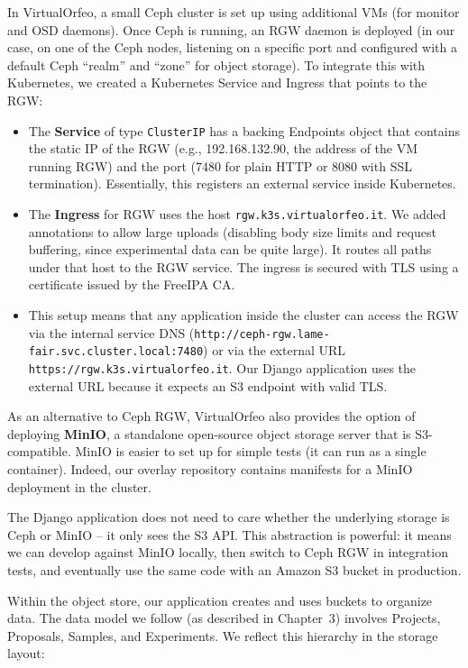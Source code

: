 In VirtualOrfeo, a small Ceph cluster is set up using additional VMs (for monitor 
and OSD daemons). Once Ceph is running, an RGW daemon is deployed (in our case, 
on one of the Ceph nodes, listening on a specific port and configured with a 
default Ceph ``realm'' and ``zone'' for object storage). To integrate this with 
Kubernetes, we created a Kubernetes Service and Ingress that points to the RGW:  

\begin{itemize}
	\item The \textbf{Service} of type \texttt{ClusterIP} has a backing Endpoints 
	object that contains the static IP of the RGW (e.g., 192.168.132.90, the 
	address of the VM running RGW) and the port (7480 for plain HTTP or 8080 with 
	SSL termination). Essentially, this registers an external service inside 
	Kubernetes.  
	\item The \textbf{Ingress} for RGW uses the host \texttt{rgw.k3s.virtualorfeo.it}. 
	We added annotations to allow large uploads (disabling body size limits and 
	request buffering, since experimental data can 
	be quite large). It routes all paths under that host to the RGW service. The 
	ingress is secured with TLS using a certificate issued by the FreeIPA CA.  
	\item This setup means that any application inside the cluster can access the 
	RGW via the internal service DNS 
	(\texttt{http://ceph-rgw.lame-fair.svc.cluster.local:7480}) or via the 
	external URL \texttt{https://rgw.k3s.virtualorfeo.it}. Our Django application 
	uses the external URL because it expects an S3 endpoint with valid TLS.  
\end{itemize}

\medskip

As an alternative to Ceph RGW, VirtualOrfeo also provides the option of deploying 
\textbf{MinIO}, a standalone open-source object storage server that is 
S3-compatible. MinIO is easier to set up for simple tests (it can run as a 
single container). Indeed, our overlay repository contains manifests for a MinIO 
deployment in the cluster.  

The Django application does not need to care whether the underlying storage is 
Ceph or MinIO – it only sees the S3 API. This abstraction is powerful: it means 
we can develop against MinIO locally, then switch to Ceph RGW in integration 
tests, and eventually use the same code with an Amazon S3 bucket in production.

\medskip

Within the object store, our application creates and uses buckets to organize 
data. The data model we follow (as described in Chapter~3) involves Projects, 
Proposals, Samples, and Experiments. We reflect this hierarchy in the storage 
layout:  

